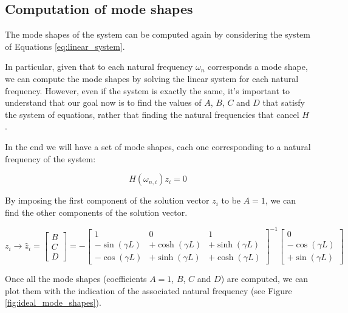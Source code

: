 \subsection{Computation of mode shapes}
\label{subsec:mode_shapes}

The mode shapes of the system can be computed again by considering the system of Equations \ref{eq:linear_system}.

In particular, given that to each natural frequency $\omega_n$ corresponds a mode shape, we can compute the mode shapes by solving the linear system for each natural frequency.
However, even if the system is exactly the same, it's important to understand that our goal now is to find the values of $A$, $B$, $C$ and $D$ that satisfy the system of equations, rather that finding the natural frequencies that cancel $H$.

In the end we will have a set of mode shapes, each one corresponding to a natural frequency of the system:

\begin{equation}
    H(\omega_{n, i}) z_i = 0
\end{equation}

By imposing the first component of the solution vector $z_i$ to be $A = 1$, we can find the other components of the solution vector.

\begin{equation}
    [H(\omega_{n, i})] z_i
    \rightarrow
    \hat z_i
    =
    \begin{bmatrix}
        B \\
        C \\
        D
    \end{bmatrix}
    =
    - \begin{bmatrix}
        1               & 0                & 1                \\
        -\sin(\gamma L) & +\cosh(\gamma L) & +\sinh(\gamma L) \\
        -\cos(\gamma L) & +\sinh(\gamma L) & +\cosh(\gamma L)
    \end{bmatrix}^{-1}
    \begin{bmatrix}
        0               \\
        -\cos(\gamma L) \\
        +\sin(\gamma L)
    \end{bmatrix}
    \label{eq:linear_system_for_mode_shapes}
\end{equation}

Once all the mode shapes (coefficients $A = 1$, $B$, $C$ and $D$) are computed, we can plot them with the indication of the associated natural frequency (see Figure \ref{fig:ideal_mode_shapes}).


